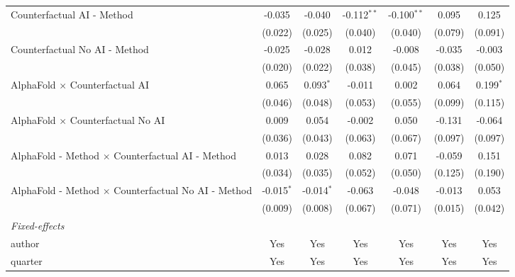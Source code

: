 \begin{tabular}{lcccccc}
   Counterfactual AI - Method                                 & -0.035       & -0.040        & -0.112$^{**}$ & -0.100$^{**}$ & 0.095   & 0.125\\   
                                                              & (0.022)      & (0.025)       & (0.040)       & (0.040)       & (0.079) & (0.091)\\   
   Counterfactual No AI - Method                              & -0.025       & -0.028        & 0.012         & -0.008        & -0.035  & -0.003\\   
                                                              & (0.020)      & (0.022)       & (0.038)       & (0.045)       & (0.038) & (0.050)\\   
   AlphaFold $\times$ Counterfactual AI                       & 0.065        & 0.093$^{*}$   & -0.011        & 0.002         & 0.064   & 0.199$^{*}$\\   
                                                              & (0.046)      & (0.048)       & (0.053)       & (0.055)       & (0.099) & (0.115)\\   
   AlphaFold $\times$ Counterfactual No AI                    & 0.009        & 0.054         & -0.002        & 0.050         & -0.131  & -0.064\\   
                                                              & (0.036)      & (0.043)       & (0.063)       & (0.067)       & (0.097) & (0.097)\\   
   AlphaFold - Method $\times$ Counterfactual AI - Method     & 0.013        & 0.028         & 0.082         & 0.071         & -0.059  & 0.151\\   
                                                              & (0.034)      & (0.035)       & (0.052)       & (0.050)       & (0.125) & (0.190)\\   
   AlphaFold - Method $\times$ Counterfactual No AI - Method  & -0.015$^{*}$ & -0.014$^{*}$  & -0.063        & -0.048        & -0.013  & 0.053\\   
                                                              & (0.009)      & (0.008)       & (0.067)       & (0.071)       & (0.015) & (0.042)\\   
   \midrule
   \emph{Fixed-effects}\\
   author                                                     & Yes          & Yes           & Yes           & Yes           & Yes     & Yes\\  
   quarter                                                    & Yes          & Yes           & Yes           & Yes           & Yes     & Yes\\  

\end{tabular}
